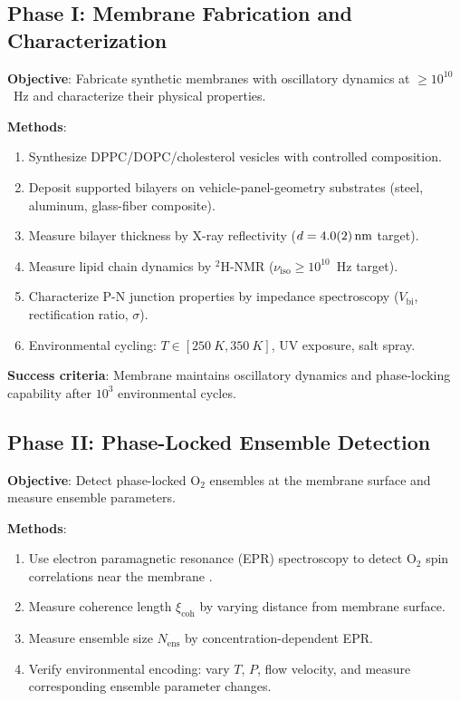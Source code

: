 \documentclass[twocolumn,10pt]{article}
\theoremstyle{definition}
\theoremstyle{remark}
\newcommand{\xicoh}{\xi_{\mathrm{coh}}}
\newcommand{\Nens}{N_{\mathrm{ens}}}
\begin{document}
\subsection{Phase I: Membrane Fabrication and Characterization}

\textbf{Objective}: Fabricate synthetic membranes with oscillatory dynamics at $\geq 10^{10}$~Hz and characterize their physical properties.

\textbf{Methods}:
\begin{enumerate}[label=\arabic*.]
  \item Synthesize DPPC/DOPC/cholesterol vesicles with controlled composition.
  \item Deposit supported bilayers on vehicle-panel-geometry substrates (steel, aluminum, glass-fiber composite).
  \item Measure bilayer thickness by X-ray reflectivity ($d = \SI{4.0 \pm 0.2}{nm}$ target).
  \item Measure lipid chain dynamics by $^2$H-NMR ($\nu_{\mathrm{iso}} \geq 10^{10}$~Hz target).
  \item Characterize P-N junction properties by impedance spectroscopy ($V_{\mathrm{bi}}$, rectification ratio, $\sigma$).
  \item Environmental cycling: $T \in [\SI{250}{K}, \SI{350}{K}]$, UV exposure, salt spray.
\end{enumerate}

\textbf{Success criteria}: Membrane maintains oscillatory dynamics and phase-locking capability after $10^3$ environmental cycles.

\subsection{Phase II: Phase-Locked Ensemble Detection}

\textbf{Objective}: Detect phase-locked $\mathrm{O}_2$ ensembles at the membrane surface and measure ensemble parameters.

\textbf{Methods}:
\begin{enumerate}[label=\arabic*.]
  \item Use electron paramagnetic resonance (EPR) spectroscopy to detect $\mathrm{O}_2$ spin correlations near the membrane \cite{herzberg1945molecular}.
  \item Measure coherence length $\xicoh$ by varying distance from membrane surface.
  \item Measure ensemble size $\Nens$ by concentration-dependent EPR.
  \item Verify environmental encoding: vary $T$, $P$, flow velocity, and measure corresponding ensemble parameter changes.
\end{enumerate}
\end{document}
